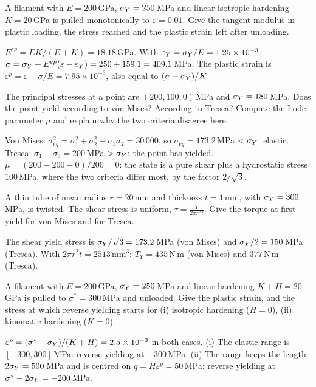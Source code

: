 
\label{exo:pl-sq-tangent}
%
A filament with $E=200$\,GPa, $\sigma_{Y}=250$\,MPa and linear isotropic hardening
$K=20$\,GPa is pulled monotonically to $\varepsilon=0.01$. Give the tangent
modulus in plastic loading, the stress reached and the plastic strain left
after unloading.
\begin{solution}
$E^{ep}=EK/(E+K)=18.18$\,GPa. With $\varepsilon_Y=\sigma_{Y}/E=1.25\times10^{-3}$,
$\sigma=\sigma_{Y}+E^{ep}(\varepsilon-\varepsilon_Y)=250+159.1=409.1$\,MPa. The
plastic strain is $\varepsilon^p=\varepsilon-\sigma/E=7.95\times10^{-3}$, also
equal to $(\sigma-\sigma_{Y})/K$.
\end{solution}

\label{exo:pl-sq-criteria}
%
The principal stresses at a point are $(200,100,0)$\,MPa and $\sigma_{Y}=180$\,MPa.
Does the point yield according to von Mises? According to Tresca? Compute the
Lode parameter $\mu$ and explain why the two criteria disagree here.
\begin{solution}
Von Mises: $\sigma_{eq}^2=\sigma_1^2+\sigma_2^2-\sigma_1\sigma_2=30\,000$, so
$\sigma_{eq}=173.2$\,MPa $<\sigma_{Y}$: elastic. Tresca: $\sigma_1-\sigma_3=200$\,MPa
$>\sigma_{Y}$: the point has yielded. $\mu=(200-200-0)/200=0$: the state is a pure
shear plus a hydrostatic stress $100$\,MPa, where the two criteria differ most,
by the factor $2/\sqrt3$.
\end{solution}

\label{exo:pl-sq-tube}
%
A thin tube of mean radius $r=20$\,mm and thickness $t=1$\,mm, with
$\sigma_{Y}=300$\,MPa, is twisted. The shear stress is uniform,
$\displaystyle \tau=\frac{T}{2\pi r^2t}$. Give the torque at first yield for von Mises and
for Tresca.
\begin{solution}
The shear yield stress is $\sigma_{Y}/\sqrt3=173.2$\,MPa (von Mises) and
$\sigma_{Y}/2=150$\,MPa (Tresca). With $2\pi r^2t=2513$\,mm$^3$: $T_Y=435$\,N\,m
(von Mises) and $377$\,N\,m (Tresca).
\end{solution}

\label{exo:pl-sq-bauschinger}
%
A filament with $E=200$\,GPa, $\sigma_{Y}=250$\,MPa and linear hardening
$K+H=20$\,GPa is pulled to $\sigma^*=300$\,MPa and unloaded. Give the plastic
strain, and the stress at which reverse yielding starts for (i) isotropic
hardening ($H=0$), (ii) kinematic hardening ($K=0$).
\begin{solution}
$\varepsilon^p=(\sigma^*-\sigma_{Y})/(K+H)=2.5\times10^{-3}$ in both cases. (i) The
elastic range is $[-300,300]$\,MPa: reverse yielding at $-300$\,MPa. (ii)
The range keeps the length $2\sigma_{Y}=500$\,MPa and is centred on
$q=H\varepsilon^p=50$\,MPa: reverse yielding at $\sigma^*-2\sigma_{Y}=-200$\,MPa.
\end{solution}

